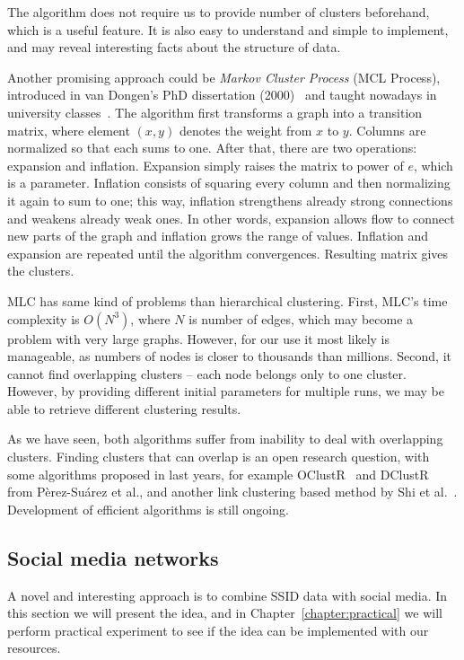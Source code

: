 \documentclass[12pt,a4paper,oneside,pdftex]{report}
\begin{document}
The algorithm does not require us to provide number of clusters beforehand, which is a useful feature. It is also easy to understand and simple to implement, and may reveal interesting facts about the structure of data.

Another promising approach could be \emph{Markov Cluster Process} (MCL Process), introduced in van Dongen's PhD dissertation (2000)~\cite{van2000graph} and taught nowadays in university classes~\cite{mlc_macropol}. The algorithm first transforms a graph into a transition matrix, where element $(x,y)$ denotes the weight from $x$ to $y$. Columns are normalized so that each sums to one. After that, there are two operations: expansion and inflation. Expansion simply raises the matrix to power of $e$, which is a parameter. Inflation consists of squaring every column and then normalizing it again to sum to one; this way, inflation strengthens already strong connections and weakens already weak ones. In other words, expansion allows flow to connect new parts of the graph and inflation grows the range of values. Inflation and expansion are repeated until the algorithm convergences. Resulting matrix gives the clusters.

MLC has same kind of problems than hierarchical clustering. First, MLC's time complexity is $O(N^3)$, where $N$ is number of edges, which may become a problem with very large graphs. However, for our use it most likely is manageable, as numbers of nodes is closer to thousands than millions. Second, it cannot find overlapping clusters -- each node belongs only to one cluster. However, by providing different initial parameters for multiple runs, we may be able to retrieve different clustering results.

As we have seen, both algorithms suffer from inability to deal with overlapping clusters. Finding clusters that can overlap is an open research question, with some algorithms proposed in last years, for example OClustR~\cite{PerezSuarez2013234} and DClustR~\cite{PerezSuarez20133040} from P\`{e}rez-Su\'{a}rez et al., and another link clustering based method by Shi et al.~\cite{Shi2013394}. Development of efficient algorithms is still ongoing.


\subsection{Social media networks}
\label{subsec:social_media}

A novel and interesting approach is to combine SSID data with social media. In this section we will present the idea, and in Chapter~\ref{chapter:practical} we will perform practical experiment to see if the idea can be implemented with our resources.
\end{document}
